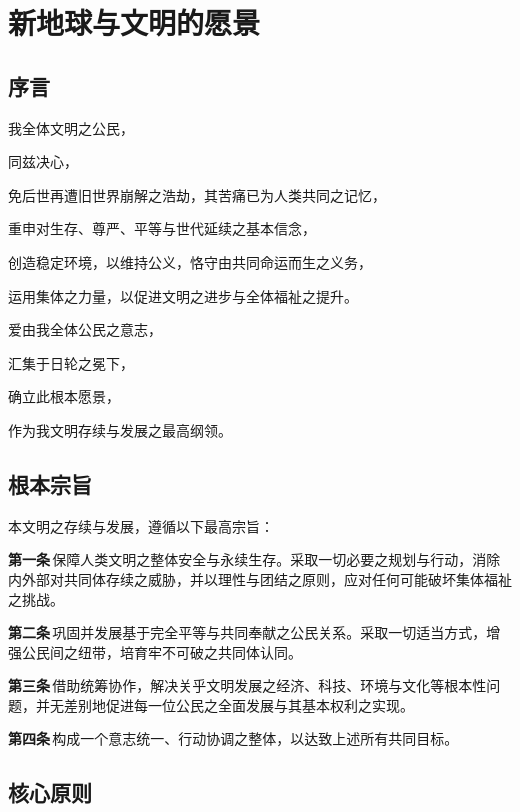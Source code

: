 \newpage

\section{新地球与文明的愿景}\label{ux65b0ux5730ux7403ux4e0eux6587ux660eux7684ux613fux666f}

\subsection{序言}\label{ux5e8fux8a00}

我全体文明之公民，

同兹决心，

免后世再遭旧世界崩解之浩劫，其苦痛已为人类共同之记忆，

重申对生存、尊严、平等与世代延续之基本信念，

创造稳定环境，以维持公义，恪守由共同命运而生之义务，

运用集体之力量，以促进文明之进步与全体福祉之提升。

爱由我全体公民之意志，

汇集于日轮之冕下，

确立此根本愿景，

作为我文明存续与发展之最高纲领。

\subsection{根本宗旨}\label{ux7b2cux4e00ux7ae0-ux6839ux672cux5b97ux65e8}

本文明之存续与发展，遵循以下最高宗旨：

\textbf{第一条}\,保障人类文明之整体安全与永续生存。采取一切必要之规划与行动，消除内外部对共同体存续之威胁，并以理性与团结之原则，应对任何可能破坏集体福祉之挑战。

\textbf{第二条}\,巩固并发展基于完全平等与共同奉献之公民关系。采取一切适当方式，增强公民间之纽带，培育牢不可破之共同体认同。

\textbf{第三条}\,借助统筹协作，解决关乎文明发展之经济、科技、环境与文化等根本性问题，并无差别地促进每一位公民之全面发展与其基本权利之实现。

\textbf{第四条}\,构成一个意志统一、行动协调之整体，以达致上述所有共同目标。

\subsection{核心原则}\label{ux7b2cux4e8cux7ae0-ux6838ux5fc3ux539fux5219}

